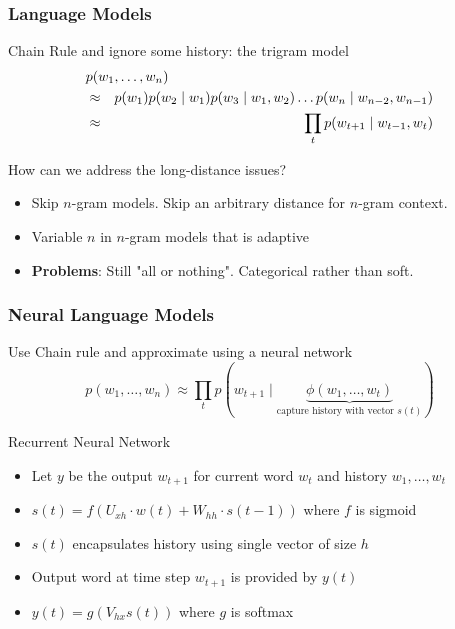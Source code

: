 \begin{frame}
\frametitle{Language Models}
\begin{block}{Chain Rule and ignore some history: the trigram model}
\begin{eqnarray*}
\lefteqn{p(w_1, \ldots, w_n) } \\
&\approx& p(w_1) p(w_2 \mid w_1) p(w_3 \mid w_1, w_2) \ldots p(w_n \mid w_{n-2}, w_{n-1}) \\
&\approx& \prod_{t} p(w_{t+1} \mid w_{t-1}, w_t)
\end{eqnarray*}
\end{block}
\pause
\begin{block}{How can we address the long-distance issues?}
\begin{itemize}
\item Skip $n$-gram models. Skip an arbitrary distance for $n$-gram context.
\item Variable $n$ in $n$-gram models that is adaptive
\item {\bf Problems}: Still "all or nothing". Categorical rather than soft.
\end{itemize}
\end{block}
\end{frame}

\begin{frame}
\frametitle{Neural Language Models}
\begin{block}{Use Chain rule and approximate using a neural network}
\[ p(w_1, \ldots, w_n) \approx \prod_{t} p(w_{t+1} \mid \underbrace{\phi(w_1, \ldots, w_t)}_{\text{capture history with vector $s(t)$}}) \]
\end{block}
\pause
\begin{block}{Recurrent Neural Network}
\begin{itemize}[<+->]
	\item Let $y$ be the output $w_{t+1}$ for current word $w_t$ and history $w_1, \ldots, w_t$
	\item $s(t) = f(U_{xh} \cdot w(t) + W_{hh} \cdot s(t-1))$ where $f$ is sigmoid
	\item $s(t)$ encapsulates history using single vector of size $h$
	\item Output word at time step $w_{t+1}$ is provided by $y(t)$
	\item $y(t) = g(V_{hx} s(t))$ where $g$ is softmax
\end{itemize}
\end{block}
\end{frame}

